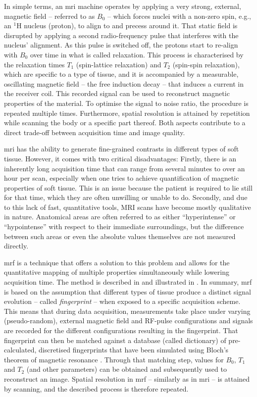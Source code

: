 In simple terms, an \acrshort{mri} machine operates by applying a very strong, external, magnetic field -- referred to as $B_0$ -- which forces nuclei with a non-zero spin, e.g., an $^{1}\text{H}$ nucleus (proton), to align to and precess around it. That static field is disrupted by applying a second radio-frequency pulse that interferes with the nucleus' alignment. As this pulse is switched off, the protons start to re-align with $B_0$ over time in what is called relaxation. This process is characterised by the relaxation times $T_1$ (spin-lattice relaxation) and $T_2$ (spin-spin relaxation), which are specific to a type of tissue, and it is accompanied by a measurable, oscillating magnetic field -- the free induction decay --  that induces a current in the receiver coil. This recorded signal can be used to reconstruct magnetic properties of the material. To optimise the signal to noise ratio, the procedure is repeated multiple times. Furthermore, spatial resolution is attained by repetition while scanning the body or a specific part thereof. Both aspects contribute to a direct trade-off between acquisition time and image quality.

\acrshort{mri} has the ability to generate fine-grained contrasts in different types of soft tissue. However, it comes with two critical disadvantages: Firstly, there is an inherently long acquisition time that can range from several minutes to over an hour per scan, especially when one tries to achieve quantification of magnetic properties of soft tissue. This is an issue because the patient is required to lie still for that time, which they are often unwilling or unable to do. Secondly, and due to this lack of fast, quantitative tools, MRI scans have become mostly qualitative in nature. Anatomical areas are often referred to as either ``hyperintense'' or ``hypointense'' with respect to their immediate surroundings, but the difference between such areas or even the absolute values themselves are not measured directly.

\acrfull{mrf} is a technique \cite{Ma:2013Magnetic} that offers a solution to this problem and allows for the quantitative mapping of multiple properties simultaneously while lowering acquisition time. The method is described in \cite{Bipin:2019Magnetic} and illustrated in . In summary, \acrshort{mrf} is based on the assumption that different types of tissue produce a distinct signal evolution -- called \emph{fingerprint} -- when exposed to a specific acquisition scheme. This means that during data acquisition, measurements take place under varying (pseudo-random), external magnetic field and RF-pulse configurations and signals are recorded for the different configurations resulting in the fingerprint. That fingerprint can then be matched against a database (called dictionary) of pre-calculated, discretised fingerprints that have been simulated using Bloch's theorem of magnetic resonance \cite{Bloch:1946Nuclear}. Through that matching step, values for $B_0$, $T_1$ and $T_2$ (and other parameters) can be obtained and subsequently used to reconstruct an image. Spatial resolution in \acrshort{mrf} -- similarly as in \acrshort{mri} -- is attained by scanning, and the described process is therefore repeated.

